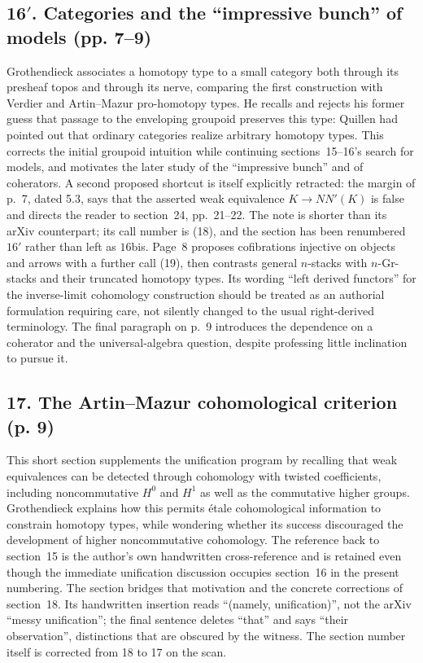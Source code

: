 \documentclass[10pt,oneside]{book}
\begin{document}
\subsection*{16$'$. Categories and the ``impressive bunch'' of models (pp. 7--9)}
Grothendieck associates a homotopy type to a small category both through its presheaf topos and through its nerve, comparing the first construction with Verdier and Artin--Mazur pro-homotopy types. He recalls and rejects his former guess that passage to the enveloping groupoid preserves this type: Quillen had pointed out that ordinary categories realize arbitrary homotopy types. This corrects the initial groupoid intuition while continuing sections~15--16's search for models, and motivates the later study of the ``impressive bunch'' and of coherators. A second proposed shortcut is itself explicitly retracted: the margin of p.~7, dated 5.3, says that the asserted weak equivalence $K\longrightarrow NN'(K)$ is false and directs the reader to section~24, pp.~21--22. The note is shorter than its arXiv counterpart; its call number is (18), and the section has been renumbered $16'$ rather than left as $16$bis. Page~8 proposes cofibrations injective on objects and arrows with a further call (19), then contrasts general $n$-stacks with $n$-Gr-stacks and their truncated homotopy types. Its wording ``left derived functors'' for the inverse-limit cohomology construction should be treated as an authorial formulation requiring care, not silently changed to the usual right-derived terminology. The final paragraph on p.~9 introduces the dependence on a coherator and the universal-algebra question, despite professing little inclination to pursue it.

\subsection*{17. The Artin--Mazur cohomological criterion (p. 9)}
This short section supplements the unification program by recalling that weak equivalences can be detected through cohomology with twisted coefficients, including noncommutative $H^0$ and $H^1$ as well as the commutative higher groups. Grothendieck explains how this permits étale cohomological information to constrain homotopy types, while wondering whether its success discouraged the development of higher noncommutative cohomology. The reference back to section~15 is the author's own handwritten cross-reference and is retained even though the immediate unification discussion occupies section~16 in the present numbering. The section bridges that motivation and the concrete corrections of section~18. Its handwritten insertion reads ``(namely, unification)'', not the arXiv ``messy unification''; the final sentence deletes ``that'' and says ``their observation'', distinctions that are obscured by the witness. The section number itself is corrected from 18 to 17 on the scan.
\end{document}
